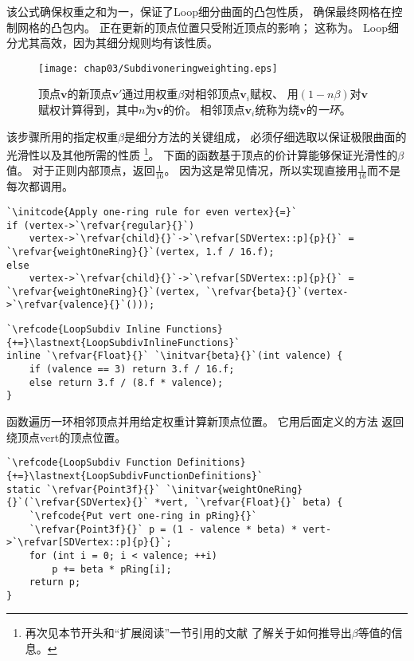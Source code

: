 该公式确保权重之和为一，保证了Loop细分曲面的凸包性质，
确保最终网格在控制网格的凸包内。
正在更新的顶点位置只受附近顶点的影响；
这称为。
Loop细分尤其高效，因为其细分规则均有该性质。
\begin{figure}[htbp]
    \centering\texttt{[image: chap03/Subdivoneringweighting.eps]}
    \caption{顶点$\bm v$的新顶点$\bm v'$通过用权重$\beta$对相邻顶点$\bm v_i$赋权、
        用$(1-n\beta)$对$\bm v$赋权计算得到，其中$n$为$\bm v$的价。
        相邻顶点$\bm v_i$统称为绕$\bm v$的\emph{一环}。}
    \label{fig:3.33}
\end{figure}

该步骤所用的指定权重$\beta$是细分方法的关键组成，
必须仔细选取以保证极限曲面的光滑性以及其他所需的性质
\footnote{再次见本节开头和“扩展阅读”一节引用的文献
    了解关于如何推导出$\beta$等值的信息。}。
下面的函数基于顶点的价计算能够保证光滑性的$\beta$值。
对于正则内部顶点，返回$\displaystyle\frac{1}{16}$。
因为这是常见情况，所以实现直接用$\displaystyle\frac{1}{16}$而不是每次都调用。
\begin{lstlisting}
`\initcode{Apply one-ring rule for even vertex}{=}`
if (vertex->`\refvar{regular}{}`)
    vertex->`\refvar{child}{}`->`\refvar[SDVertex::p]{p}{}` = `\refvar{weightOneRing}{}`(vertex, 1.f / 16.f);
else
    vertex->`\refvar{child}{}`->`\refvar[SDVertex::p]{p}{}` = `\refvar{weightOneRing}{}`(vertex, `\refvar{beta}{}`(vertex->`\refvar{valence}{}`()));
\end{lstlisting}
\begin{lstlisting}
`\refcode{LoopSubdiv Inline Functions}{+=}\lastnext{LoopSubdivInlineFunctions}`
inline `\refvar{Float}{}` `\initvar{beta}{}`(int valence) {
    if (valence == 3) return 3.f / 16.f;
    else return 3.f / (8.f * valence);
}
\end{lstlisting}

函数遍历一环相邻顶点并用给定权重计算新顶点位置。
它用后面定义的方法
返回绕顶点{\ttfamily vert}的顶点位置。
\begin{lstlisting}
`\refcode{LoopSubdiv Function Definitions}{+=}\lastnext{LoopSubdivFunctionDefinitions}`
static `\refvar{Point3f}{}` `\initvar{weightOneRing}{}`(`\refvar{SDVertex}{}` *vert, `\refvar{Float}{}` beta) {
    `\refcode{Put vert one-ring in pRing}{}`
    `\refvar{Point3f}{}` p = (1 - valence * beta) * vert->`\refvar[SDVertex::p]{p}{}`;
    for (int i = 0; i < valence; ++i)
        p += beta * pRing[i];
    return p;
}  
\end{lstlisting}

